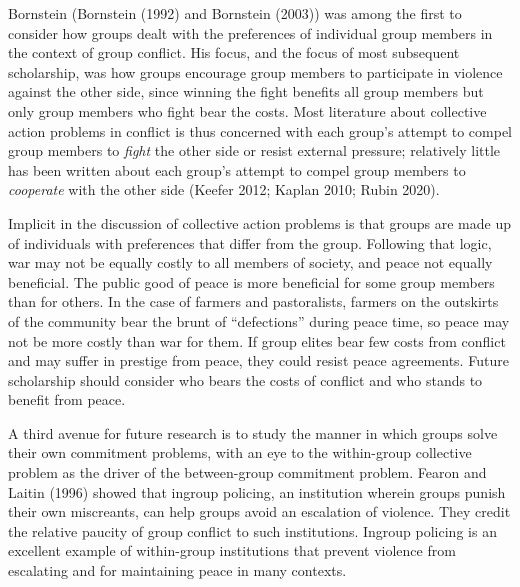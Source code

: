 \documentclass[11pt]{article}
\begin{document}
Bornstein (Bornstein (1992) and Bornstein (2003)) was among the first to
consider how groups dealt with the preferences of individual group
members in the context of group conflict. His focus, and the focus of
most subsequent scholarship, was how groups encourage group members to
participate in violence against the other side, since winning the fight
benefits all group members but only group members who fight bear the
costs. Most literature about collective action problems in conflict is
thus concerned with each group's attempt to compel group members to
\emph{fight} the other side or resist external pressure; relatively
little has been written about each group's attempt to compel group
members to \emph{cooperate} with the other side (Keefer 2012; Kaplan
2010; Rubin 2020).

Implicit in the discussion of collective action problems is that groups
are made up of individuals with preferences that differ from the group.
Following that logic, war may not be equally costly to all members of
society, and peace not equally beneficial. The public good of peace is
more beneficial for some group members than for others. In the case of
farmers and pastoralists, farmers on the outskirts of the community bear
the brunt of ``defections'' during peace time, so peace may not be more
costly than war for them. If group elites bear few costs from conflict
and may suffer in prestige from peace, they could resist peace
agreements. Future scholarship should consider who bears the costs of
conflict and who stands to benefit from peace.

A third avenue for future research is to study the manner in which
groups solve their own commitment problems, with an eye to the
within-group collective problem as the driver of the between-group
commitment problem. Fearon and Laitin (1996) showed that ingroup
policing, an institution wherein groups punish their own miscreants, can
help groups avoid an escalation of violence. They credit the relative
paucity of group conflict to such institutions. Ingroup policing is an
excellent example of within-group institutions that prevent violence
from escalating and for maintaining peace in many contexts.
\end{document}
